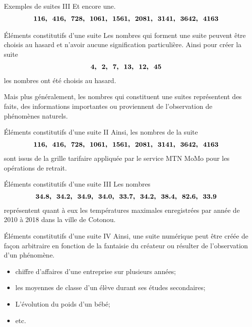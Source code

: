 \documentclass{beamer}
\begin{document}
\begin{frame}{Exemples de suites III}
  Et encore une.
  \begin{align*}
    \footnotesize
    \bm{116,\ \ 416,\ \ 728,\ \ 1061,\ \ 1561,\ \ 2081,\ \ 3141,\ \ 3642,\ \ 4163}
  \end{align*}
\end{frame}

\begin{frame}{\'{E}léments constitutifs d'une suite}
  Les nombres qui forment une suite peuvent être choisis au hasard et n'avoir aucune signification particulière. Ainsi pour créer la suite
  \begin{align*}
    \footnotesize
    \bm{4,\ \ 2,\ \ 7,\ \ 13,\ \ 12,\ \ 45}
  \end{align*}
  les nombres ont été choisis au hasard.

  Mais plus généralement, les nombres qui constituent une suites représentent des faits, des informations importantes ou proviennent de l'observation de phénomènes naturels.
\end{frame}

\begin{frame}{\'{E}léments constitutifs d'une suite II}  
  Ainsi, les nombres de la suite
  \begin{align*}
    \footnotesize
    \bm{116,\ \ 416,\ \ 728,\ \ 1061,\ \ 1561,\ \ 2081,\ \ 3141,\ \ 3642,\ \ 4163}
  \end{align*}
  sont issus de la grille tarifaire appliquée par le service MTN MoMo pour les opérations de retrait.
\end{frame}

\begin{frame}{\'{E}léments constitutifs d'une suite III}  
  Les nombres
  \begin{align*}
    \footnotesize
    \bm{34.8,\ \ 34.2,\ \ 34.9,\ \ 34.0,\ \ 33.7,\ \ 34.2,\ \ 38.4,\ \ 82.6,\ \ 33.9}
  \end{align*}
  représentent quant à eux les températures maximales enregistrées par année de 2010 à 2018 dans la ville de Cotonou. 
\end{frame}

\begin{frame}{\'{E}léments constitutifs d'une suite IV}
  Ainsi, une suite numérique peut être créée de façon arbitraire en fonction de la fantaisie du créateur ou résulter de l'observation d'un phénomène.
  \begin{itemize}
    \item chiffre d'affaires d'une entreprise sur plusieurs années;
    \item les moyennes de classe d'un élève durant ses études secondaires;
    \item L'évolution du poids d'un bébé;
    \item etc.
  \end{itemize}
\end{frame}
\end{document}

